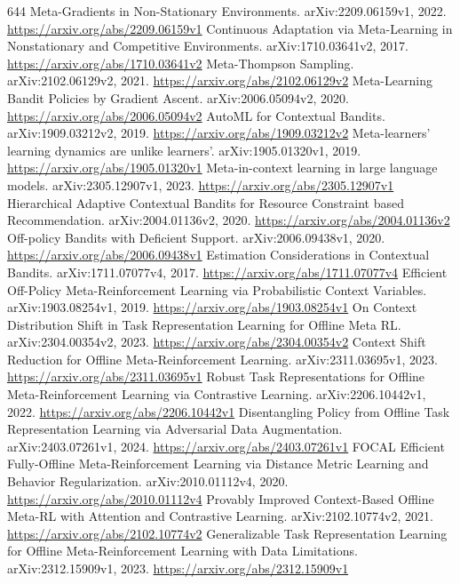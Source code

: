 \documentclass[11pt]{article}
\begin{document}
\begin{thebibliography}{644}
 Meta-Gradients in Non-Stationary Environments. arXiv:2209.06159v1, 2022. \url{https://arxiv.org/abs/2209.06159v1}
 Continuous Adaptation via Meta-Learning in Nonstationary and Competitive Environments. arXiv:1710.03641v2, 2017. \url{https://arxiv.org/abs/1710.03641v2}
 Meta-Thompson Sampling. arXiv:2102.06129v2, 2021. \url{https://arxiv.org/abs/2102.06129v2}
 Meta-Learning Bandit Policies by Gradient Ascent. arXiv:2006.05094v2, 2020. \url{https://arxiv.org/abs/2006.05094v2}
 AutoML for Contextual Bandits. arXiv:1909.03212v2, 2019. \url{https://arxiv.org/abs/1909.03212v2}
 Meta-learners' learning dynamics are unlike learners'. arXiv:1905.01320v1, 2019. \url{https://arxiv.org/abs/1905.01320v1}
 Meta-in-context learning in large language models. arXiv:2305.12907v1, 2023. \url{https://arxiv.org/abs/2305.12907v1}
 Hierarchical Adaptive Contextual Bandits for Resource Constraint based Recommendation. arXiv:2004.01136v2, 2020. \url{https://arxiv.org/abs/2004.01136v2}
 Off-policy Bandits with Deficient Support. arXiv:2006.09438v1, 2020. \url{https://arxiv.org/abs/2006.09438v1}
 Estimation Considerations in Contextual Bandits. arXiv:1711.07077v4, 2017. \url{https://arxiv.org/abs/1711.07077v4}
 Efficient Off-Policy Meta-Reinforcement Learning via Probabilistic Context Variables. arXiv:1903.08254v1, 2019. \url{https://arxiv.org/abs/1903.08254v1}
 On Context Distribution Shift in Task Representation Learning for Offline Meta RL. arXiv:2304.00354v2, 2023. \url{https://arxiv.org/abs/2304.00354v2}
 Context Shift Reduction for Offline Meta-Reinforcement Learning. arXiv:2311.03695v1, 2023. \url{https://arxiv.org/abs/2311.03695v1}
 Robust Task Representations for Offline Meta-Reinforcement Learning via Contrastive Learning. arXiv:2206.10442v1, 2022. \url{https://arxiv.org/abs/2206.10442v1}
 Disentangling Policy from Offline Task Representation Learning via Adversarial Data Augmentation. arXiv:2403.07261v1, 2024. \url{https://arxiv.org/abs/2403.07261v1}
 FOCAL Efficient Fully-Offline Meta-Reinforcement Learning via Distance Metric Learning and Behavior Regularization. arXiv:2010.01112v4, 2020. \url{https://arxiv.org/abs/2010.01112v4}
 Provably Improved Context-Based Offline Meta-RL with Attention and Contrastive Learning. arXiv:2102.10774v2, 2021. \url{https://arxiv.org/abs/2102.10774v2}
 Generalizable Task Representation Learning for Offline Meta-Reinforcement Learning with Data Limitations. arXiv:2312.15909v1, 2023. \url{https://arxiv.org/abs/2312.15909v1}

\end{thebibliography}
\end{document}
